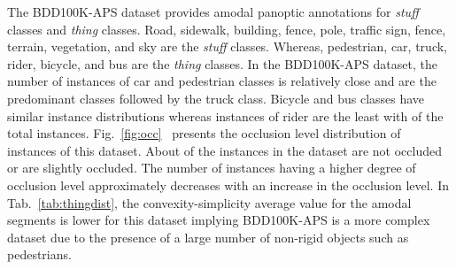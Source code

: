 \documentclass[10pt,twocolumn,letterpaper]{article}
\newcommand{\figref}[1]{Fig.~\ref{#1}}
\newcommand{\tabref}[1]{Tab.~\ref{#1}}
\begin{document}
The BDD100K-APS dataset provides amodal panoptic annotations for  \textit{stuff} classes and  \textit{thing} classes. Road, sidewalk, building, fence, pole, traffic sign, fence, terrain, vegetation, and sky are the \textit{stuff} classes. Whereas, pedestrian, car, truck, rider, bicycle, and bus are the \textit{thing} classes. In the \mbox{BDD100K-APS} dataset, the number of instances of car and pedestrian classes is relatively close and are the predominant classes followed by the truck class.  Bicycle and bus classes have similar instance distributions whereas instances of rider are the least with  of the total instances. \figref{fig:occ}~ presents the occlusion level distribution of instances of this dataset. About  of the instances in the dataset are not occluded or are slightly occluded. The number of instances having a higher degree of occlusion level approximately decreases with an increase in the occlusion level. In \tabref{tab:thingdist}, the convexity-simplicity average value for the amodal segments is lower for this dataset implying BDD100K-APS is a more complex dataset due to the presence of a large number of non-rigid objects such as pedestrians.
\end{document}
